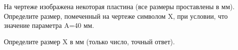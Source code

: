 
На чертеже изображена некоторая пластина (все размеры проставлены в мм).  
Определите размер, помеченный на чертеже символом X, при условии, что значение параметра A=40 мм.


Определите размер X в мм (только число, точный ответ).